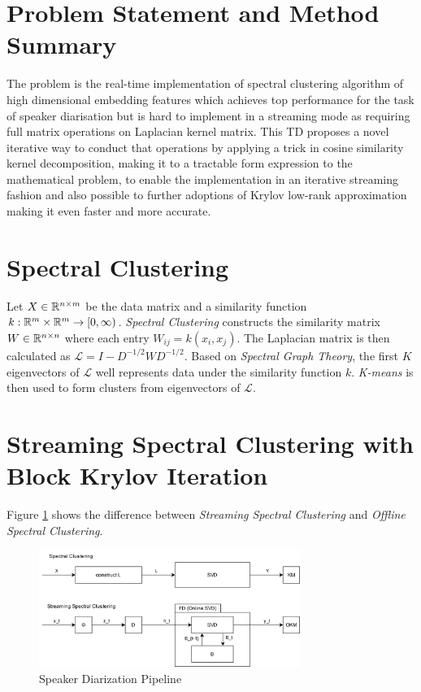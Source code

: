 \section{Problem Statement and Method Summary}
The problem is the real-time implementation of spectral clustering algorithm of high dimensional embedding features which achieves top performance for the task of speaker diarisation but is hard to implement in a streaming mode as requiring full matrix operations on Laplacian kernel matrix. This TD proposes a novel iterative way to conduct that operations by applying a trick in cosine similarity kernel decomposition, making it to a tractable form expression to the mathematical problem, to enable the implementation in an iterative streaming fashion and also possible to further adoptions of Krylov low-rank approximation making it even faster and more accurate.

\section{Spectral Clustering}
Let $X \in \mathbb{R}^{n \times m}$ be the data matrix and a similarity function $k: \mathbb{R}^m \times \mathbb{R}^m \to [0, \infty)$. \textit{Spectral Clustering} constructs the similarity matrix $W \in \mathbb{R}^{n \times n}$ where each entry $W_{i j} = k(x_i, x_j)$. The Laplacian matrix is then calculated as $\mathcal{L} = I - D^{-1/2} W D^{-1/2}$. Based on \textit{Spectral Graph Theory}, the first $K$ eigenvectors of $\mathcal{L}$ well represents data under the similarity function $k$. \textit{K-means} is then used to form clusters from eigenvectors of $\mathcal{L}$.

\section{Streaming Spectral Clustering with Block Krylov Iteration}

Figure \ref{fig:spectral} shows the difference between \textit{Streaming Spectral Clustering} and \textit{Offline Spectral Clustering}.

\begin{figure}[htb]
    \begin{minipage}[b]{1.0\linewidth}
    \centering
    \centerline{\includegraphics[width=8.5cm]{assets/ssc_diagram.png}}
    \end{minipage}
\caption{Speaker Diarization Pipeline}
\label{fig:spectral}
\end{figure}

